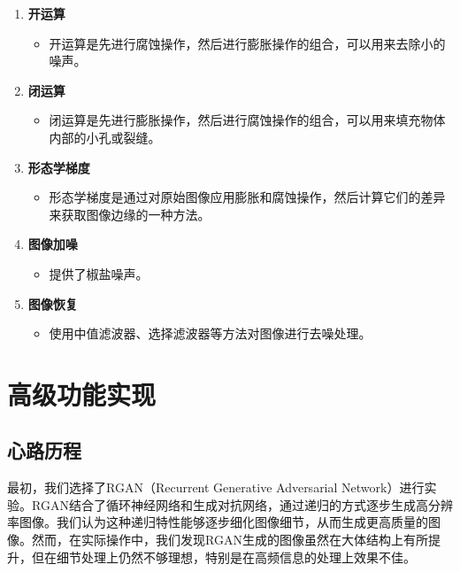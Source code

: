 \documentclass[UTF8,openany]{ctexbook}
\begin{document}
\begin{enumerate}[label=\arabic*., leftmargin=*]
      \item \textbf{开运算}
      \begin{itemize}[label=--, leftmargin=*]
      \item 开运算是先进行腐蚀操作，然后进行膨胀操作的组合，可以用来去除小的噪声。
      \end{itemize}
      
      \item \textbf{闭运算}
      \begin{itemize}[label=--, leftmargin=*]
      \item 闭运算是先进行膨胀操作，然后进行腐蚀操作的组合，可以用来填充物体内部的小孔或裂缝。
      \end{itemize}
      
      \item \textbf{形态学梯度}
      \begin{itemize}[label=--, leftmargin=*]
      \item 形态学梯度是通过对原始图像应用膨胀和腐蚀操作，然后计算它们的差异来获取图像边缘的一种方法。
      \end{itemize}
      
      \item \textbf{图像加噪}
      \begin{itemize}[label=--, leftmargin=*]
      \item 提供了椒盐噪声。
      \end{itemize}

      \item \textbf{图像恢复}
      \begin{itemize}[label=--, leftmargin=*]
      \item 使用中值滤波器、选择滤波器等方法对图像进行去噪处理。
      \end{itemize}
\end{enumerate}

\section{高级功能实现}

\subsection{心路历程}

最初，我们选择了RGAN（Recurrent Generative Adversarial Network）进行实验。RGAN结合了循环神经网络和生成对抗网络，通过递归的方式逐步生成高分辨率图像。我们认为这种递归特性能够逐步细化图像细节，从而生成更高质量的图像。然而，在实际操作中，我们发现RGAN生成的图像虽然在大体结构上有所提升，但在细节处理上仍然不够理想，特别是在高频信息的处理上效果不佳。\cite{ref1}
\end{document}
